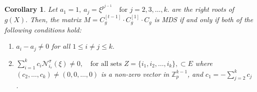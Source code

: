 \documentclass[11pt]{article}
\newtheorem{corollary}{Corollary}
\begin{document}
\begin{corollary}
		Let 
	\(
	a_1=1,~a_j = \xi^{p^{j-1}} \quad \text{for } j = 2,3,\ldots,k.
	\) are the right roots of $g(X).$
	Then, the matrix 
	\(
	M = C^{[t-1]}_g\cdot C^{[1]}_g\cdot C_g
	\)
	is MDS  if and only if both of the following conditions hold:
	\begin{enumerate}
		\item[\textnormal{(i)}] $a_i-a_j\neq 0$ for all $1\leq i\neq j \leq k.$ 
		\item[\textnormal{(ii)}] 
		\(
		\sum_{i=1}^k c_i \mathcal{N}^\sigma_{i_r}(\xi) \neq 0, \quad 
		\text{for all sets } Z = \{i_1, i_2, \ldots, i_k\},
		\subset E\)
		where $(c_2, \ldots, c_k) \neq (0,0,\ldots,0)$ is a non-zero vector in $\mathbb{Z}_p^{k-1}$, and $c_1=-\sum_{j=2}^{k}c_j$. 
	\end{enumerate}
\end{corollary}
\end{document}
